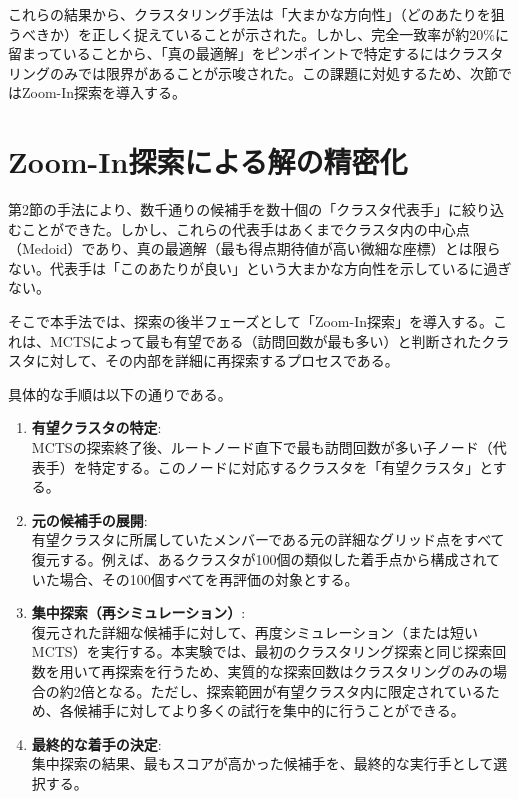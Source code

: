 \documentclass[11pt,a4j]{jreport}
\begin{document}
これらの結果から、クラスタリング手法は「大まかな方向性」（どのあたりを狙うべきか）を正しく捉えていることが示された。しかし、完全一致率が約20\%に留まっていることから、「真の最適解」をピンポイントで特定するにはクラスタリングのみでは限界があることが示唆された。この課題に対処するため、次節ではZoom-In探索を導入する。



\section[Zoom-In探索]{Zoom-In探索による解の精密化}
第2節の手法により、数千通りの候補手を数十個の「クラスタ代表手」に絞り込むことができた。しかし、これらの代表手はあくまでクラスタ内の中心点（Medoid）であり、真の最適解（最も得点期待値が高い微細な座標）とは限らない。代表手は「このあたりが良い」という大まかな方向性を示しているに過ぎない。

そこで本手法では、探索の後半フェーズとして「Zoom-In探索」を導入する。これは、MCTSによって最も有望である（訪問回数が最も多い）と判断されたクラスタに対して、その内部を詳細に再探索するプロセスである。

具体的な手順は以下の通りである。

\begin{enumerate}
    \item \textbf{有望クラスタの特定}: \\
    MCTSの探索終了後、ルートノード直下で最も訪問回数が多い子ノード（代表手）を特定する。このノードに対応するクラスタを「有望クラスタ」とする。

    \item \textbf{元の候補手の展開}: \\
    有望クラスタに所属していたメンバーである元の詳細なグリッド点をすべて復元する。例えば、あるクラスタが100個の類似した着手点から構成されていた場合、その100個すべてを再評価の対象とする。

    \item \textbf{集中探索（再シミュレーション）}: \\
    復元された詳細な候補手に対して、再度シミュレーション（または短いMCTS）を実行する。本実験では、最初のクラスタリング探索と同じ探索回数を用いて再探索を行うため、実質的な探索回数はクラスタリングのみの場合の約2倍となる。ただし、探索範囲が有望クラスタ内に限定されているため、各候補手に対してより多くの試行を集中的に行うことができる。

    \item \textbf{最終的な着手の決定}: \\
    集中探索の結果、最もスコアが高かった候補手を、最終的な実行手として選択する。
\end{enumerate}
\end{document}
